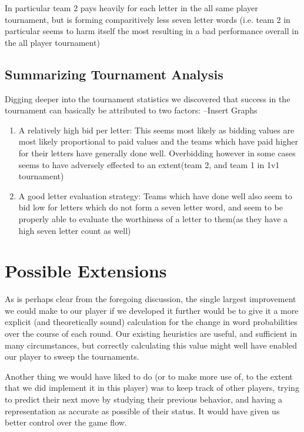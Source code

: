 \documentclass[11pt]{article}
\begin{document}
In particular team 2 pays heavily for each letter in the all same player tournament, but is forming comparitively less seven letter words (i.e. team 2 in particular seems to harm itself the most resulting in a bad performance overall in the all player tournament)
	\subsection{Summarizing Tournament Analysis}
		
	Digging deeper into the tournament statistics we discovered that success in the tournament can basically be attributed to two factors:
	--Insert Graphs
	\begin{enumerate}
	\item{} A relatively high bid per letter: This seems most likely as bidding values are most likely proportional to paid values and the teams which have paid higher for their letters have generally done well. Overbidding however in some cases seems to have adversely effected to an extent(team 2, and team 1 in 1v1 tournament)
	\item{} A good letter evaluation strategy: Teams which have done well also seem to bid low for letters which do not form a seven letter word, and seem to be properly able to evaluate the worthiness of a letter to them(as they have a high seven letter count as well)
\end{enumerate}



\section{Possible Extensions}

As is perhaps clear from the foregoing discussion, the single largest improvement we could make to our player if we developed it further would be to give it a more explicit (and theoretically sound) calculation for the change in word probabilities over the course of each round.  Our existing heuristics are useful, and sufficient in many circumstances, but correctly calculating this value might well have enabled our player to sweep the tournaments.

Another thing we would have liked to do (or to make more use of, to the extent that we did implement it in this player) was to keep track of other players, trying to predict their next move by studying their previous behavior, and having a representation as accurate as possible of their status. It would have given us better control over the game flow.
\end{document}
